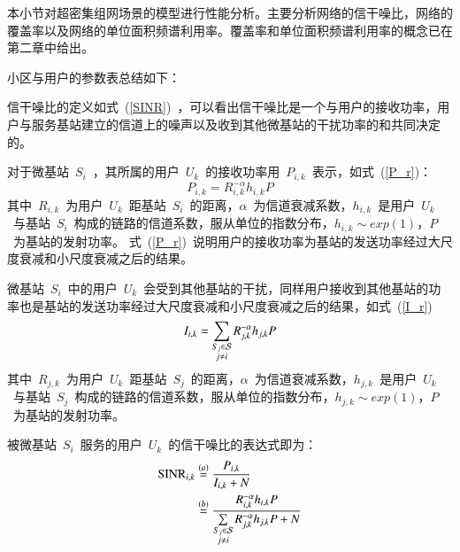 
本小节对超密集组网场景的模型进行性能分析。主要分析网络的信干噪比，网络的覆盖率以及网络的单位面积频谱利用率。覆盖率和单位面积频谱利用率的概念已在第二章中给出。

小区与用户的参数表总结如下：




信干噪比的定义如式~(\ref{SINR})~，可以看出信干噪比是一个与用户的接收功率，用户与服务基站建立的信道上的噪声以及收到其他微基站的干扰功率的和共同决定的。

对于微基站~$S_i$~，其所属的用户~$U_k$~的接收功率用~$P_{i,k}$~表示，如式~(\ref{P_r})：
\begin{equation}\label{P_r}
  P_{i,k} = R_{i,k}^{-\alpha} h_{i,k} P
\end{equation}
其中~$R_{i,k}$~为用户~$U_k$~距基站~$S_i$~的距离，$\alpha$~为信道衰减系数，$h_{i,k}$~是用户~$U_k$~与基站~$S_i$~构成的链路的信道系数，服从单位的指数分布，$h_{i,k}\sim exp(1)$，$P$~为基站的发射功率。
式~(\ref{P_r})~说明用户的接收功率为基站的发送功率经过大尺度衰减和小尺度衰减之后的结果。

微基站~$S_i$~中的用户~$U_k$~会受到其他基站的干扰，同样用户接收到其他基站的功率也是基站的发送功率经过大尺度衰减和小尺度衰减之后的结果，如式~(\ref{I_r})~
\begin{equation}\label{I_r}
  I_{i,k} = \sum_{\begin{subarray}{c} S_j\in \mathcal{S}\\ j \neq i\end{subarray}} R_{j,k}^{-\alpha} h_{j,k} P
\end{equation}
其中~$R_{j,k}$~为用户~$U_k$~距基站~$S_j$~的距离，$\alpha$~为信道衰减系数，$h_{j,k}$~是用户~$U_k$~与基站~$S_j$~构成的链路的信道系数，服从单位的指数分布，$h_{j,k}\sim exp(1)$，$P$~为基站的发射功率。

被微基站~$S_i$~服务的用户~$U_k$~的信干噪比的表达式即为：
\begin{equation}\label{SINR_r}
  \begin{aligned}
    \mathrm{SINR}_{i, k}&\overset{(a)}{=}\frac{P_{i,k}}{I_{i,k}+N} \\
                 &\overset{(b)}{=}\frac{R_{i,k}^{-\alpha} h_{i,k} P}{\sum\limits_{\begin{subarray}{c} S_j\in \mathcal{S}\\ j \neq i\end{subarray}} {R_{j,k}^{-\alpha} h_{j,k} P} + N}
  \end{aligned}
\end{equation}


